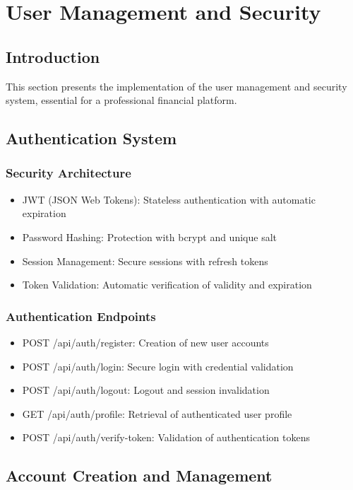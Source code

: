 \section{User Management and Security}

\subsection{Introduction}
This section presents the implementation of the user management and security system, essential for a professional financial platform.

\subsection{Authentication System}
\subsubsection{Security Architecture}
\begin{itemize}
    \item JWT (JSON Web Tokens): Stateless authentication with automatic expiration
    \item Password Hashing: Protection with bcrypt and unique salt
    \item Session Management: Secure sessions with refresh tokens
    \item Token Validation: Automatic verification of validity and expiration
\end{itemize}

\subsubsection{Authentication Endpoints}
\begin{itemize}
    \item POST /api/auth/register: Creation of new user accounts
    \item POST /api/auth/login: Secure login with credential validation
    \item POST /api/auth/logout: Logout and session invalidation
    \item GET /api/auth/profile: Retrieval of authenticated user profile
    \item POST /api/auth/verify-token: Validation of authentication tokens
\end{itemize}

\subsection{Account Creation and Management}
